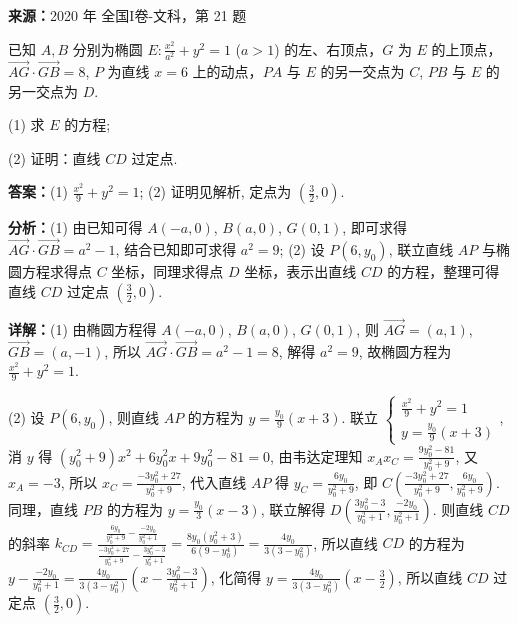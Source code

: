 \begin{question}[points=12]
\textbf{来源：}2020 年 全国I卷-文科，第 21 题\par
已知 $A, B$ 分别为椭圆 $E: \frac{x^2}{a^2} + y^2 = 1$ ($a>1$) 的左、右顶点，$G$ 为 $E$ 的上顶点，$\overrightarrow{AG} \cdot \overrightarrow{GB} = 8$, $P$ 为直线 $x=6$ 上的动点，$PA$ 与 $E$ 的另一交点为 $C$, $PB$ 与 $E$ 的另一交点为 $D$.



(1) 求 $E$ 的方程;



(2) 证明：直线 $CD$ 过定点.
\begin{solution}
\textbf{答案：}(1) $\frac{x^2}{9} + y^2 = 1$; (2) 证明见解析, 定点为 $\left(\frac{3}{2}, 0\right)$.

\textbf{分析：}(1) 由已知可得 $A(-a,0)$, $B(a,0)$, $G(0,1)$, 即可求得 $\overrightarrow{AG}\cdot\overrightarrow{GB}=a^2-1$, 结合已知即可求得 $a^2=9$; (2) 设 $P(6,y_0)$, 联立直线 $AP$ 与椭圆方程求得点 $C$ 坐标，同理求得点 $D$ 坐标，表示出直线 $CD$ 的方程，整理可得直线 $CD$ 过定点 $\left(\frac{3}{2},0\right)$.

\textbf{详解：}(1) 由椭圆方程得 $A(-a,0)$, $B(a,0)$, $G(0,1)$, 则 $\overrightarrow{AG}=(a,1)$, $\overrightarrow{GB}=(a,-1)$, 所以 $\overrightarrow{AG}\cdot\overrightarrow{GB}=a^2-1=8$, 解得 $a^2=9$, 故椭圆方程为 $\frac{x^2}{9}+y^2=1$.

(2) 设 $P(6,y_0)$, 则直线 $AP$ 的方程为 $y=\frac{y_0}{9}(x+3)$. 联立 $\begin{cases} \frac{x^2}{9}+y^2=1 \\ y=\frac{y_0}{9}(x+3) \end{cases}$, 消 $y$ 得 $(y_0^2+9)x^2+6y_0^2x+9y_0^2-81=0$, 由韦达定理知 $x_A x_C = \frac{9y_0^2-81}{y_0^2+9}$, 又 $x_A=-3$, 所以 $x_C = \frac{-3y_0^2+27}{y_0^2+9}$, 代入直线 $AP$ 得 $y_C = \frac{6y_0}{y_0^2+9}$, 即 $C\left(\frac{-3y_0^2+27}{y_0^2+9}, \frac{6y_0}{y_0^2+9}\right)$. 同理，直线 $PB$ 的方程为 $y=\frac{y_0}{3}(x-3)$, 联立解得 $D\left(\frac{3y_0^2-3}{y_0^2+1}, \frac{-2y_0}{y_0^2+1}\right)$. 则直线 $CD$ 的斜率 $k_{CD} = \frac{\frac{6y_0}{y_0^2+9} - \frac{-2y_0}{y_0^2+1}}{\frac{-3y_0^2+27}{y_0^2+9} - \frac{3y_0^2-3}{y_0^2+1}} = \frac{8y_0(y_0^2+3)}{6(9-y_0^4)} = \frac{4y_0}{3(3-y_0^2)}$, 所以直线 $CD$ 的方程为 $y - \frac{-2y_0}{y_0^2+1} = \frac{4y_0}{3(3-y_0^2)}\left(x - \frac{3y_0^2-3}{y_0^2+1}\right)$, 化简得 $y = \frac{4y_0}{3(3-y_0^2)}\left(x - \frac{3}{2}\right)$, 所以直线 $CD$ 过定点 $\left(\frac{3}{2},0\right)$.
\end{solution}
\end{question}

